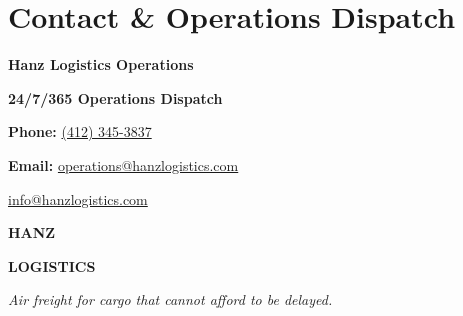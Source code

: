 \documentclass[10pt]{article}
\begin{document}
\section*{Contact \& Operations Dispatch}
\noindent\setlength{\fboxsep}{0pt}%
\colorbox{HanzLight}{%
  \parbox{\textwidth}{%
    \vspace{9pt}\hspace{12pt}%
    \begin{minipage}[c]{0.58\textwidth}
      {\fontsize{12.2}{14.2}\selectfont\bfseries\color{HanzOrange}Hanz Logistics Operations\par}%
      \vspace{2.5pt}%
      {\fontsize{9.4}{11.8}\selectfont\bfseries\color{HanzBlue}24/7/365 Operations Dispatch\par}%
      \vspace{3.5pt}%
      {\fontsize{9.4}{11.8}\selectfont\color{HanzBlue}%
        \textbf{Phone:} \href{tel:+14123453837}{(412) 345-3837}\par\vspace{1.8pt}%
        \textbf{Email:} \href{mailto:operations@hanzlogistics.com}{operations@hanzlogistics.com}\par\vspace{1.8pt}%
        \href{mailto:info@hanzlogistics.com}{info@hanzlogistics.com}\par}%
    \end{minipage}\hfill
    \begin{minipage}[c]{0.34\textwidth}
      \raggedleft
      {\fontsize{14.5}{16}\selectfont\bfseries\color{HanzBlue}HANZ\par}%
      {\fontsize{11.2}{12.8}\selectfont\bfseries\color{HanzOrange}LOGISTICS\par}%
      \vspace{3.5pt}%
      {\fontsize{8.3}{10.4}\selectfont\itshape\color{HanzMuted}%
        Air freight for cargo that cannot afford to be delayed.\par}%
    \end{minipage}%
    \hspace{12pt}\vspace{9pt}%
  }%
}
\end{document}
